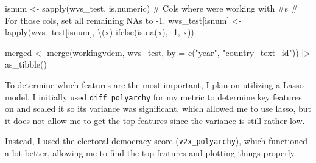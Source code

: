 \documentclass[
  letterpaper,
  DIV=11,
  numbers=noendperiod]{scrartcl}
\newenvironment{Shaded}{\begin{snugshade}}{\end{snugshade}}
\newcommand{\AttributeTok}[1]{\textcolor[rgb]{0.40,0.45,0.13}{#1}}
\newcommand{\CommentTok}[1]{\textcolor[rgb]{0.37,0.37,0.37}{#1}}
\newcommand{\DecValTok}[1]{\textcolor[rgb]{0.68,0.00,0.00}{#1}}
\newcommand{\FunctionTok}[1]{\textcolor[rgb]{0.28,0.35,0.67}{#1}}
\newcommand{\NormalTok}[1]{\textcolor[rgb]{0.00,0.23,0.31}{#1}}
\newcommand{\OtherTok}[1]{\textcolor[rgb]{0.00,0.23,0.31}{#1}}
\newcommand{\SpecialCharTok}[1]{\textcolor[rgb]{0.37,0.37,0.37}{#1}}
\newcommand{\StringTok}[1]{\textcolor[rgb]{0.13,0.47,0.30}{#1}}
\begin{document}
\begin{Shaded}
\begin{Highlighting}[]
\NormalTok{isnum }\OtherTok{\textless{}{-}} \FunctionTok{sapply}\NormalTok{(wvs\_test, is.numeric) }\CommentTok{\# Cols where we\textquotesingle{}re working with \#\textquotesingle{}s}
\CommentTok{\# For those cols, set all remaining NAs to {-}1.}
\NormalTok{wvs\_test[isnum] }\OtherTok{\textless{}{-}} \FunctionTok{lapply}\NormalTok{(wvs\_test[isnum], \textbackslash{}(x) }\FunctionTok{ifelse}\NormalTok{(}\FunctionTok{is.na}\NormalTok{(x), }\SpecialCharTok{{-}}\DecValTok{1}\NormalTok{, x))}

\NormalTok{merged }\OtherTok{\textless{}{-}} \FunctionTok{merge}\NormalTok{(workingvdem, wvs\_test, }\AttributeTok{by =} \FunctionTok{c}\NormalTok{(}\StringTok{"year"}\NormalTok{, }\StringTok{"country\_text\_id"}\NormalTok{)) }\SpecialCharTok{|\textgreater{}}
  \FunctionTok{as\_tibble}\NormalTok{()}
\end{Highlighting}
\end{Shaded}

To determine which features are the most important, I plan on utilizing
a Lasso model. I initially used \texttt{diff\_polyarchy} for my metric
to determine key features on and scaled it so its variance was
significant, which allowed me to use lasso, but it does not allow me to
get the top features since the variance is still rather low.

Instead, I used the electoral democracy score (\texttt{v2x\_polyarchy}),
which functioned a lot better, allowing me to find the top features and
plotting things properly.

\begin{Shaded}
\end{Shaded}
\end{document}

